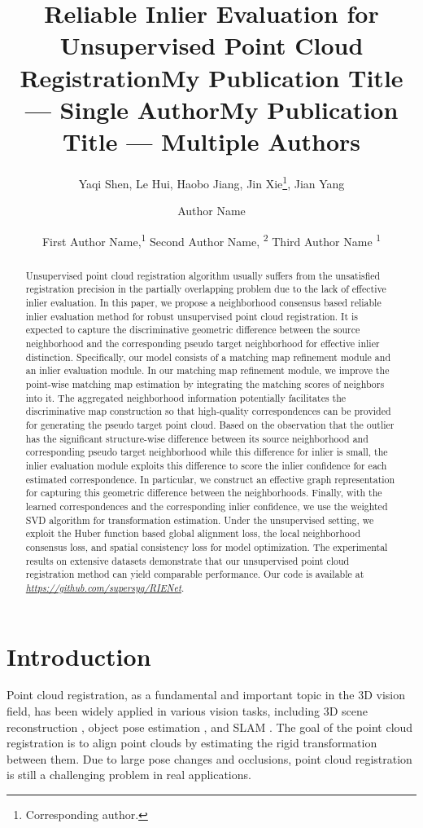 \documentclass[letterpaper]{article} %
\title{Reliable Inlier Evaluation for Unsupervised Point Cloud Registration}
\author{
	Yaqi Shen,
	Le Hui,
	Haobo Jiang,
	Jin Xie\thanks{Corresponding author.},
	Jian Yang
}
\title{My Publication Title --- Single Author}
\author {
    Author Name
}
\title{My Publication Title --- Multiple Authors}
\author {
    First Author Name,\textsuperscript{\rm 1}
    Second Author Name, \textsuperscript{\rm 2}
    Third Author Name \textsuperscript{\rm 1}
}
\begin{document}
	\maketitle
	
	\begin{abstract}	
	Unsupervised point cloud registration algorithm usually suffers from the unsatisfied registration precision in the partially overlapping problem due to the lack of effective inlier evaluation. In this paper, we propose a neighborhood consensus based reliable inlier evaluation method for robust unsupervised point cloud registration. It is expected to capture the discriminative geometric difference between the source neighborhood and the corresponding pseudo target neighborhood for effective inlier distinction. Specifically, our model consists of a matching map refinement module and an inlier evaluation module. In our matching map refinement module, we improve the point-wise matching map estimation by integrating the matching scores of neighbors into it. The aggregated neighborhood information potentially facilitates the discriminative map construction so that high-quality correspondences can be provided for generating the pseudo target point cloud. Based on the observation that the outlier has the significant structure-wise difference between its source neighborhood and corresponding pseudo target neighborhood while this difference for inlier is small, the inlier evaluation module exploits this difference to score the inlier confidence for each estimated correspondence. In particular, we construct an effective graph representation for capturing this geometric difference between the neighborhoods. Finally, with the learned correspondences and the corresponding inlier confidence, we use the weighted SVD algorithm for transformation estimation. Under the unsupervised setting, we exploit the Huber function based global alignment loss, the local neighborhood consensus loss, and spatial consistency loss for model optimization. The experimental results on extensive datasets demonstrate that our unsupervised point cloud registration method can yield comparable performance. Our code is available at \emph{\url{https://github.com/supersyq/RIENet}}.
	\end{abstract}
	
	\section{Introduction}
	Point cloud registration, as a fundamental and important topic in the 3D vision field, has been widely applied in various vision tasks, including 3D scene reconstruction \cite{agarwal2011building,schonberger2016structure}, object pose estimation \cite{wong2017segicp}, and SLAM \cite{deschaud2018imls,zhang2014loam}. 
	The goal of the point cloud registration is to align point clouds by estimating the rigid transformation between them.
	Due to large pose changes and occlusions, point cloud registration is still a challenging problem in real applications. 
	
\end{document}

